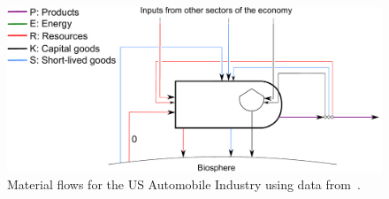 \begin{figure}[!ht]
\centering
\includegraphics[width=0.8\linewidth]{Part_1/Chapter_Materials/images/PERKS_basic_unit_materials_auto_ind.pdf}
\caption[Material flows for the US Automobile Industry]{Material 
flows for the US Automobile Industry using data from~\cite{Sullivan1998, 
MacLean1998,Schweimer2000, McCleese2002,MacLean2003, Burnham2006,
Sullivan2010, Hawkins2012}.}
\label{fig:PERKS_materials_auto}
\end{figure}

